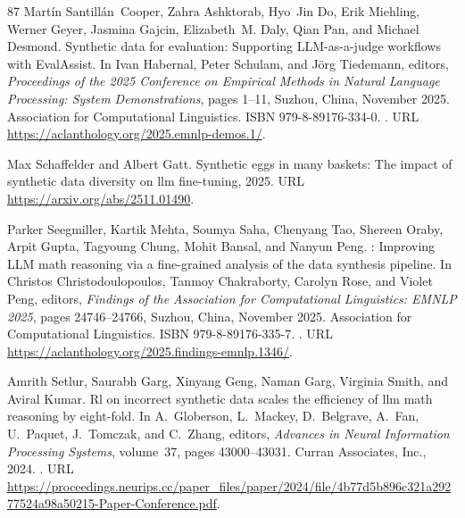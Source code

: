 \begin{thebibliography}{87}
Mart{\'i}n Santill{\'a}n~Cooper, Zahra Ashktorab, Hyo~Jin Do, Erik Miehling, Werner Geyer, Jasmina Gajcin, Elizabeth~M. Daly, Qian Pan, and Michael Desmond.
\newblock Synthetic data for evaluation: Supporting {LLM}-as-a-judge workflows with {E}val{A}ssist.
\newblock In Ivan Habernal, Peter Schulam, and J{\"o}rg Tiedemann, editors, \emph{Proceedings of the 2025 Conference on Empirical Methods in Natural Language Processing: System Demonstrations}, pages 1--11, Suzhou, China, November 2025. Association for Computational Linguistics.
\newblock ISBN 979-8-89176-334-0.
\newblock {}.
\newblock URL \url{https://aclanthology.org/2025.emnlp-demos.1/}.

Max Schaffelder and Albert Gatt.
\newblock Synthetic eggs in many baskets: The impact of synthetic data diversity on llm fine-tuning, 2025.
\newblock URL \url{https://arxiv.org/abs/2511.01490}.

Parker Seegmiller, Kartik Mehta, Soumya Saha, Chenyang Tao, Shereen Oraby, Arpit Gupta, Tagyoung Chung, Mohit Bansal, and Nanyun Peng.
: Improving {LLM} math reasoning via a fine-grained analysis of the data synthesis pipeline.
\newblock In Christos Christodoulopoulos, Tanmoy Chakraborty, Carolyn Rose, and Violet Peng, editors, \emph{Findings of the Association for Computational Linguistics: EMNLP 2025}, pages 24746--24766, Suzhou, China, November 2025. Association for Computational Linguistics.
\newblock ISBN 979-8-89176-335-7.
\newblock {}.
\newblock URL \url{https://aclanthology.org/2025.findings-emnlp.1346/}.

Amrith Setlur, Saurabh Garg, Xinyang Geng, Naman Garg, Virginia Smith, and Aviral Kumar.
\newblock Rl on incorrect synthetic data scales the efficiency of llm math reasoning by eight-fold.
\newblock In A.~Globerson, L.~Mackey, D.~Belgrave, A.~Fan, U.~Paquet, J.~Tomczak, and C.~Zhang, editors, \emph{Advances in Neural Information Processing Systems}, volume~37, pages 43000--43031. Curran Associates, Inc., 2024.
\newblock {}.
\newblock URL \url{https://proceedings.neurips.cc/paper_files/paper/2024/file/4b77d5b896c321a29277524a98a50215-Paper-Conference.pdf}.


\end{thebibliography}
